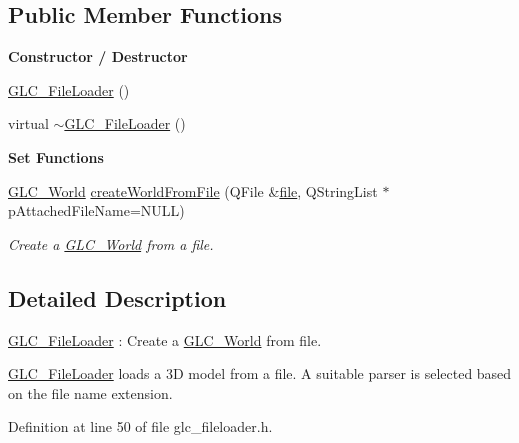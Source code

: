 \subsection*{Public Member Functions}
\begin{Indent}{\bf Constructor / Destructor}\par
\begin{DoxyCompactItemize}
\item 
\hyperlink{class_g_l_c___file_loader_af29162c45c567b466c9803858b7912ce}{G\-L\-C\-\_\-\-File\-Loader} ()
\item 
virtual \hyperlink{class_g_l_c___file_loader_a249482a687d9cf710c879cb0a373a79f}{$\sim$\-G\-L\-C\-\_\-\-File\-Loader} ()
\end{DoxyCompactItemize}
\end{Indent}
\begin{Indent}{\bf Set Functions}\par
\begin{DoxyCompactItemize}
\item 
\hyperlink{class_g_l_c___world}{G\-L\-C\-\_\-\-World} \hyperlink{class_g_l_c___file_loader_aca918ab644618daad4487decab2481a8}{create\-World\-From\-File} (Q\-File \&\hyperlink{uavobjecttemplate_8m_a97c04efa65bcf0928abf9260bc5cbf46}{file}, Q\-String\-List $\ast$p\-Attached\-File\-Name=N\-U\-L\-L)
\begin{DoxyCompactList}\small\item\em Create a \hyperlink{class_g_l_c___world}{G\-L\-C\-\_\-\-World} from a file. \end{DoxyCompactList}\end{DoxyCompactItemize}
\end{Indent}


\subsection{Detailed Description}
\hyperlink{class_g_l_c___file_loader}{G\-L\-C\-\_\-\-File\-Loader} \-: Create a \hyperlink{class_g_l_c___world}{G\-L\-C\-\_\-\-World} from file. 

\hyperlink{class_g_l_c___file_loader}{G\-L\-C\-\_\-\-File\-Loader} loads a 3\-D model from a file. A suitable parser is selected based on the file name extension. 

Definition at line 50 of file glc\-\_\-fileloader.\-h.




